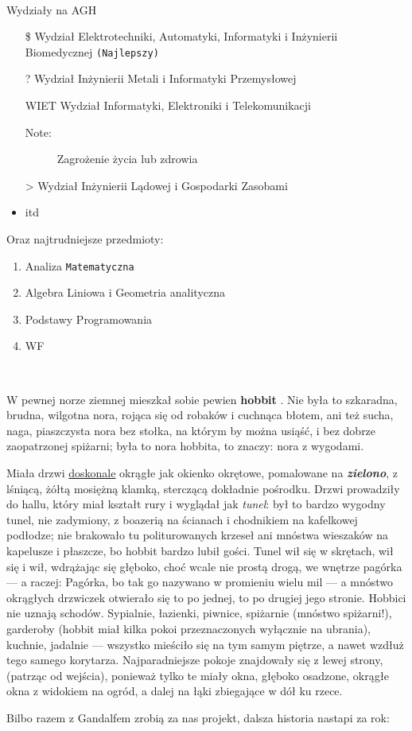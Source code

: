 \\
Wydziały na AGH
\begin{itemize}
  \item [\$] Wydział Elektrotechniki, Automatyki, Informatyki i Inżynierii Biomedycznej \verb|(Najlepszy)|
  \item [?]Wydział Inżynierii Metali i Informatyki Przemysłowej
  \item [WIET] Wydział Informatyki, Elektroniki i Telekomunikacji
  \begin{description}
     \item[Note:] Zagrożenie życia lub zdrowia
    \end{description}
  \item [\<>]Wydział Inżynierii Lądowej i Gospodarki Zasobami
  \item itd \\
\end{itemize}

Oraz najtrudniejsze przedmioty:
\begin{enumerate}
  \item Analiza \texttt{Matematyczna}
  \item Algebra Liniowa i Geometria analityczna 
  \item Podstawy Programowania
  \item WF
\end{enumerate}
\newpage

\begin{center}
\\
\end{center}

{\huge W} pewnej norze ziemnej mieszkał sobie pewien \textbf{hobbit} . Nie była to szkaradna, brudna, wilgotna nora, rojąca się od robaków i cuchnąca błotem, ani też sucha, naga, piaszczysta nora bez stołka, na którym by można usiąść, i bez dobrze zaopatrzonej spiżarni; była to nora hobbita, to znaczy: nora z wygodami.

Miała drzwi \underline{doskonale} okrągłe jak okienko okrętowe, pomalowane na \textbf{\textit{zielono}},
z lśniącą, żółtą mosiężną klamką, sterczącą dokładnie pośrodku. Drzwi prowadziły do hallu, który miał kształt rury i wyglądał jak \emph{tunel}: był to bardzo wygodny
tunel, nie zadymiony, z boazerią na ścianach i chodnikiem na kafelkowej podłodze; nie brakowało tu politurowanych krzeseł ani mnóstwa wieszaków na kapelusze i płaszcze, bo hobbit bardzo lubił gości. Tunel wił się w skrętach, wił się i wił,
wdrążając się głęboko, choć wcale nie prostą drogą, we wnętrze pagórka — a raczej: Pagórka, bo tak go nazywano w promieniu wielu mil — a mnóstwo okrągłych drzwiczek otwierało się to po jednej, to po drugiej jego stronie. Hobbici nie
uznają schodów. Sypialnie, łazienki, piwnice, spiżarnie (mnóstwo spiżarni!), garderoby (hobbit miał kilka pokoi przeznaczonych wyłącznie na ubrania), kuchnie,
jadalnie — wszystko mieściło się na tym samym piętrze, a nawet wzdłuż tego samego korytarza. Najparadniejsze pokoje znajdowały się z lewej strony, (patrząc
od wejścia), ponieważ tylko te miały okna, głęboko osadzone, okrągłe okna z widokiem na ogród, a dalej na łąki zbiegające w dół ku rzece. 

\vspace{2cm}
Bilbo razem z Gandalfem zrobią za nas projekt, dalsza historia nastapi za rok: 